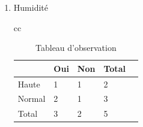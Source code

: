 \documentclass[a4paper, 11pt]{report}
\begin{document}
\begin{itemize}
\begin{enumerate}
\begin{table}[!h]
\begin{small}
\begin{tabular}{cc}

    \begin{minipage}{.5\linewidth}
   
\begin{tabular}{| l | l | l | l | l |}
\hline
 & Oui & Non & Total\\
\hline
Moyenne & 1 & 2 & 3\\
\hline
Basse & 2 & 0 & 2 \\
\hline
Total & 3 & 2 & 5 \\
\hline
\end{tabular} 
      \caption{Tableau d'observation}

    \end{minipage} &

    \begin{minipage}{.5\linewidth}
\begin{tabular}{| l | l | l |}
\hline
 & Oui & Non\\
\hline
Haute & $\frac{3*3}{5} = 1.8$ & $\frac{3*2}{5} = 1.2$\\
\hline
Basse & $\frac{2*3}{5} = 1.2$ & $\frac{2*2}{5} = 0.8$ \\
\hline
\end{tabular} 
      \caption{Tableau d'estimation}
 
   \end{minipage} 
\end{tabular}
\end{small}
\end{table}

$X^2(Température) = \frac{(1-1.8)^2}{1.8}+\frac{(2-1.2)^2}{1.2}+\frac{(2-1.2)^2}{1.2}+\frac{(0-0.8)^2}{0.8}\\
X^2(Température) = 2.22$





\item Humidité


\begin{table}[!h]
\begin{small}
\begin{tabular}{cc}

    \begin{minipage}{.5\linewidth}
   
\begin{tabular}{| l | l | l | l | l |}
\hline
 & Oui & Non & Total\\
\hline
Haute & 1 & 1 & 2\\
\hline
Normal & 2 & 1 & 3 \\
\hline
Total & 3 & 2 & 5 \\
\hline
\end{tabular} 
      \caption{Tableau d'observation}


\end{minipage}
\end{tabular}
\end{small}
\end{table}
\end{enumerate}
\end{itemize}
\end{document}
